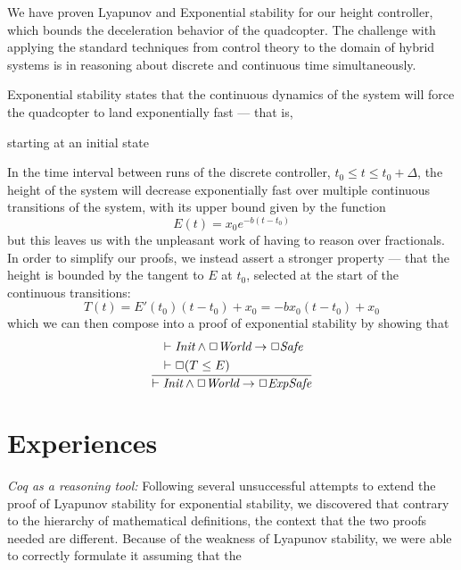 \documentclass[10pt]{sigplanconf}
\begin{document}
We have proven Lyapunov and Exponential stability for our height controller, which bounds the deceleration behavior of the quadcopter. The challenge with applying the standard techniques from control theory to the domain of hybrid systems is in reasoning about discrete and continuous time simultaneously.





Exponential stability states that the continuous dynamics of the system will force the quadcopter to land exponentially fast --- that is,

starting at an initial state

In the time interval between runs of the discrete controller, $t_0\leq t \leq t_0+\Delta$, the height of the system will decrease exponentially fast over multiple continuous transitions of the system, with its upper bound given by the function
 \[E(t)=x_0e^{-b(t-t_0)}\]
but this leaves us with the unpleasant work of having to reason over fractionals. In order to simplify our proofs, we instead assert a stronger property --- that the height is bounded by the tangent to $E$ at $t_0$, selected at the start of the continuous transitions:
\[T(t) = E'(t_0)(t-t_0)+x_0 = -bx_0(t-t_0)+x_0\]
which we can then compose into a proof of exponential stability by showing that
\[
  \frac
  {\begin{aligned}
      & \vdash \emph{Init} \land \Box \emph{World} \rightarrow \Box \emph{Safe} \\
      & \vdash \Box (T\leq E)
    \end{aligned}}
  {\vdash \emph{Init} \land \Box \emph{World} \rightarrow \Box \emph{ExpSafe}}
\]



\section {Experiences}

\emph{Coq as a reasoning tool: } Following several unsuccessful attempts to extend the proof of Lyapunov stability for exponential stability, we discovered that contrary to the hierarchy of mathematical definitions, the context that the two proofs needed are different. Because of the weakness of Lyapunov stability, we were able to correctly formulate it assuming that the
\end{document}
